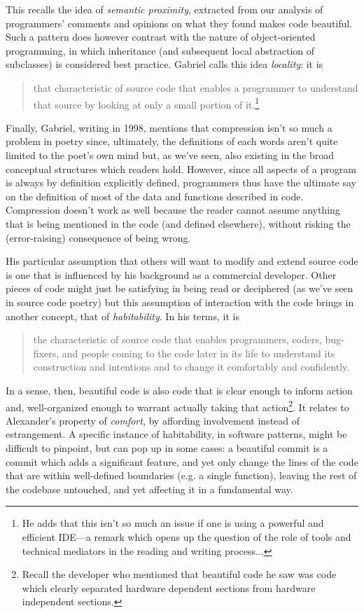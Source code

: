 \documentclass{article}
\begin{document}
This recalls the idea of \emph{semantic proximity}, extracted from our analysis of programmers' comments and opinions on what they found makes code beautiful. Such a pattern does however contrast with the nature of object-oriented programming, in which inheritance (and subsequent local abstraction of subclasses) is considered best practice. Gabriel calls this idea \emph{locality}: it is 

\begin{quote}
  that characteristic of source code that enables a programmer to understand that source by looking at only a small portion of it.\cite{gabriel_patterns_1998}\footnote{He adds that this isn't so much an issue if one is using a powerful and efficient IDE—a remark which opens up the question of the role of tools and technical mediators in the reading and writing process...}
\end{quote}

Finally, Gabriel, writing in 1998, mentions that compression isn't so much a problem in poetry since, ultimately, the definitions of each words aren't quite limited to the poet's own mind but, as we've seen, also existing in the broad conceptual structures which readers hold. However, since all aspects of a program is always by definition explicitly defined, programmers thus have the ultimate say on the definition of most of the data and functions described in code. Compression doesn't work as well because the reader cannot assume anything that is being mentioned in the code (and defined elsewhere), without risking the (error-raising) consequence of being wrong.

His particular assumption that others will want to modify and extend source code is one that is influenced by his background as a commercial developer. Other pieces of code might just be satisfying in being read or deciphered (as we've seen in source code poetry) but this assumption of interaction with the code brings in another concept, that of \emph{habitability}. In his terms, it is

\begin{quote}
  the characteristic of source code that enables programmers, coders, bug-fixers, and people coming to the code later in its life to understand its construction and intentions and to change it comfortably and confidently.\cite{gabriel_patterns_1998}
\end{quote}

In a sense, then, beautiful code is also code that is clear enough to inform action and, well-organized enough to warrant actually taking that action\footnote{Recall the developer who mentioned that beautiful code he saw was code which clearly separated hardware dependent sections from hardware independent sections.}. It relates to Alexander's property of \emph{comfort}, by affording involvement instead of estrangement. A specific instance of habitability, in software patterns, might be difficult to pinpoint, but can pop up in some cases: a beautiful commit is a commit which adds a significant feature, and yet only change the lines of the code that are within well-defined boundaries (e.g. a single function), leaving the rest of the codebase untouched, and yet affecting it in a fundamental way.
\end{document}
